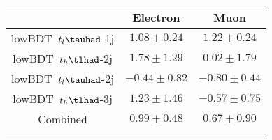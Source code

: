 \centering
\begin{tabular}{ccc} \toprule\toprule
 & Electron & Muon\\\midrule
lowBDT~$t_{l}\tauhad$-1j & $1.08\pm0.24$ & $1.22\pm0.24$\\
lowBDT~$t_{h}\tlhad$-2j & $1.78\pm1.29$ & $0.02\pm1.79$\\
lowBDT~$t_{l}\tauhad$-2j & $-0.44\pm0.82$ & $-0.80\pm0.44$\\
lowBDT~$t_{h}\tlhad$-3j & $1.23\pm1.46$ & $-0.57\pm0.75$\\
Combined & $0.99\pm0.48$ & $0.67\pm0.90$\\
\bottomrule\bottomrule\\
\end{tabular}
